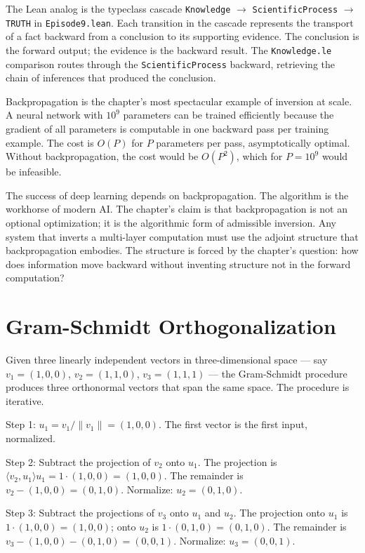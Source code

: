 The Lean analog is the typeclass cascade
\texttt{Knowledge} $\to$ \texttt{ScientificProcess} $\to$
\texttt{TRUTH} in \texttt{Episode9.lean}. Each transition in the
cascade represents the transport of a fact backward from a
conclusion to its supporting evidence. The conclusion is the
forward output; the evidence is the backward result. The
\texttt{Knowledge.le} comparison routes through the
\texttt{ScientificProcess} backward, retrieving the chain of
inferences that produced the conclusion.

Backpropagation is the chapter's most spectacular example of
inversion at scale. A neural network with $10^9$ parameters can
be trained efficiently because the gradient of all parameters
is computable in one backward pass per training example. The
cost is $O(P)$ for $P$ parameters per pass, asymptotically
optimal. Without backpropagation, the cost would be $O(P^2)$,
which for $P = 10^9$ would be infeasible.

The success of deep learning depends on backpropagation. The
algorithm is the workhorse of modern AI. The chapter's claim
is that backpropagation is not an optional optimization; it is
the algorithmic form of admissible inversion. Any system that
inverts a multi-layer computation must use the adjoint
structure that backpropagation embodies. The structure is
forced by the chapter's question: how does information move
backward without inventing structure not in the forward
computation?

\section{Gram-Schmidt Orthogonalization}
\label{se:gram-schmidt-orthogonalization}

Given three linearly independent vectors in three-dimensional space ---
say $v_1 = (1, 0, 0)$, $v_2 = (1, 1, 0)$, $v_3 = (1, 1, 1)$ --- the
Gram-Schmidt procedure produces three orthonormal vectors that span
the same space. The procedure is iterative.

Step 1: $u_1 = v_1 / \|v_1\| = (1, 0, 0)$. The first vector is the
first input, normalized.

Step 2: Subtract the projection of $v_2$ onto $u_1$. The projection is
$\langle v_2, u_1 \rangle u_1 = 1 \cdot (1, 0, 0) = (1, 0, 0)$. The
remainder is $v_2 - (1, 0, 0) = (0, 1, 0)$. Normalize: $u_2 = (0, 1,
0)$.

Step 3: Subtract the projections of $v_3$ onto $u_1$ and $u_2$. The
projection onto $u_1$ is $1 \cdot (1, 0, 0) = (1, 0, 0)$; onto $u_2$
is $1 \cdot (0, 1, 0) = (0, 1, 0)$. The remainder is $v_3 - (1, 0, 0)
- (0, 1, 0) = (0, 0, 1)$. Normalize: $u_3 = (0, 0, 1)$.

